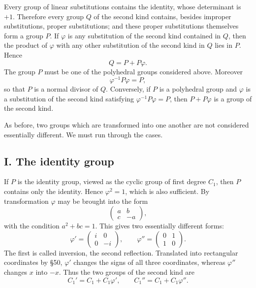 \documentclass[11pt,a4paper]{article}
\begin{document}
Every group of linear substitutions contains the identity, whose determinant is \(+1\).  Therefore every group \(Q\) of the second kind contains, besides improper substitutions, proper substitutions; and these proper substitutions themselves form a group \(P\).  If \(\varphi\) is any substitution of the second kind contained in \(Q\), then the product of \(\varphi\) with any other substitution of the second kind in \(Q\) lies in \(P\).  Hence
\begin{equation}\label{eq:62-1}
 Q=P+P\varphi.
\end{equation}
The group \(P\) must be one of the polyhedral groups considered above.  Moreover
\[
 \varphi^{-1}P\varphi=P,
\]
so that \(P\) is a normal divisor of \(Q\).  Conversely, if \(P\) is a polyhedral group and \(\varphi\) is a substitution of the second kind satisfying \(\varphi^{-1}P\varphi=P\), then \(P+P\varphi\) is a group of the second kind.

As before, two groups which are transformed into one another are not considered essentially different.  We must run through the cases.

\subsection*{I. The identity group}

If \(P\) is the identity group, viewed as the cyclic group of first degree \(C_1\), then \(P\) contains only the identity.  Hence \(\varphi^2=1\), which is also sufficient.  By transformation \(\varphi\) may be brought into the form
\[
 \begin{pmatrix}a&b\\c&-a\end{pmatrix},
\]
with the condition \(a^2+bc=1\).  This gives two essentially different forms:
\begin{equation}\label{eq:62-2}
 \varphi'=\begin{pmatrix}i&0\\0&-i\end{pmatrix},
 \qquad
 \varphi''=\begin{pmatrix}0&1\\1&0\end{pmatrix}.
\end{equation}
The first is called inversion, the second reflection.  Translated into rectangular coordinates by \S 50, \(\varphi'\) changes the signs of all three coordinates, whereas \(\varphi''\) changes \(x\) into \(-x\).  Thus the two groups of the second kind are
\[
 C_1'=C_1+C_1\varphi',
 \qquad
 C_1''=C_1+C_1\varphi''.
\]
\end{document}
